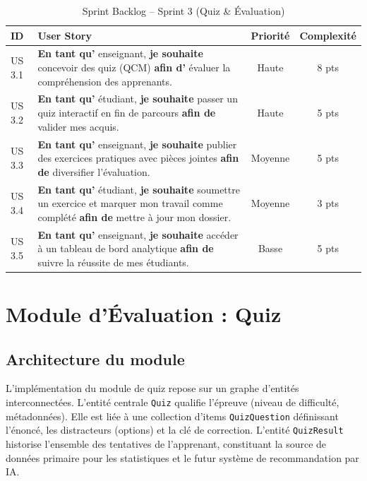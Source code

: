 \documentclass[12pt,a4paper]{report}
\begin{document}
\vspace{0.5cm}
\begin{table}[H]
\centering
\renewcommand{\arraystretch}{1.4}
\caption{Sprint Backlog -- Sprint 3 (Quiz \& Évaluation)}
\vspace{0.2cm}
\begin{tabularx}{\textwidth}{l X c c}
\toprule
\textbf{ID} & \textbf{User Story} & \textbf{Priorité} & \textbf{Complexité} \\
\midrule
US 3.1 & \textbf{En tant qu'} enseignant, \textbf{je souhaite} concevoir des quiz (QCM) \textbf{afin d'} évaluer la compréhension des apprenants. & Haute & 8 pts \\
US 3.2 & \textbf{En tant qu'} étudiant, \textbf{je souhaite} passer un quiz interactif en fin de parcours \textbf{afin de} valider mes acquis. & Haute & 5 pts \\
US 3.3 & \textbf{En tant qu'} enseignant, \textbf{je souhaite} publier des exercices pratiques avec pièces jointes \textbf{afin de} diversifier l'évaluation. & Moyenne & 5 pts \\
US 3.4 & \textbf{En tant qu'} étudiant, \textbf{je souhaite} soumettre un exercice et marquer mon travail comme complété \textbf{afin de} mettre à jour mon dossier. & Moyenne & 3 pts \\
US 3.5 & \textbf{En tant qu'} enseignant, \textbf{je souhaite} accéder à un tableau de bord analytique \textbf{afin de} suivre la réussite de mes étudiants. & Basse & 5 pts \\
\bottomrule
\end{tabularx}
\end{table}

\section{Module d'Évaluation : Quiz}

\subsection{Architecture du module}

L'implémentation du module de quiz repose sur un graphe d'entités interconnectées. L'entité centrale \texttt{Quiz} qualifie l'épreuve (niveau de difficulté, métadonnées). Elle est liée à une collection d'items \texttt{QuizQuestion} définissant l'énoncé, les distracteurs (options) et la clé de correction. L'entité \texttt{QuizResult} historise l'ensemble des tentatives de l'apprenant, constituant la source de données primaire pour les statistiques et le futur système de recommandation par IA.
\end{document}

